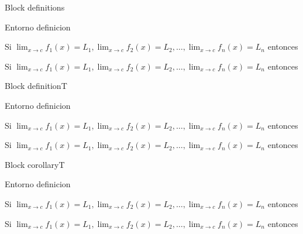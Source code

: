 \documentclass[]{beamer}
\theoremstyle{plain}
\begin{document}
\begin{frame}[fragile]{Block definitions}
\begin{source}{Entorno definicion}{}
\begin{definitions}
 Si \hspace{5pt}$\displaystyle \lim_{x\rightarrow c}f_1(x)=L_1, \displaystyle \lim_{x\rightarrow c}f_2(x)=L_2,\dots, \displaystyle \lim_{x\rightarrow c}f_n(x)=L_n $
 entonces
\end{definitions}
\end{source}
\begin{definitions}
 Si \hspace{5pt}$\displaystyle \lim_{x\rightarrow c}f_1(x)=L_1, \displaystyle \lim_{x\rightarrow c}f_2(x)=L_2,\dots, \displaystyle \lim_{x\rightarrow c}f_n(x)=L_n $
 entonces
\end{definitions}
\end{frame}
\begin{frame}[fragile]{Block definitionT}
\begin{source}{Entorno definicion}{}
\begin{definitionT}
 Si \hspace{5pt}$\displaystyle \lim_{x\rightarrow c}f_1(x)=L_1, \displaystyle \lim_{x\rightarrow c}f_2(x)=L_2,\dots, \displaystyle \lim_{x\rightarrow c}f_n(x)=L_n $
 entonces
\end{definitionT}
\end{source}
\begin{definitionT}
 Si \hspace{5pt}$\displaystyle \lim_{x\rightarrow c}f_1(x)=L_1, \displaystyle \lim_{x\rightarrow c}f_2(x)=L_2,\dots, \displaystyle \lim_{x\rightarrow c}f_n(x)=L_n $
 entonces
\end{definitionT}
\end{frame}
\begin{frame}[fragile]{Block corollaryT}
\begin{source}{Entorno definicion}{}
\begin{corollaryT}
 Si \hspace{5pt}$\displaystyle \lim_{x\rightarrow c}f_1(x)=L_1, \displaystyle \lim_{x\rightarrow c}f_2(x)=L_2,\dots, \displaystyle \lim_{x\rightarrow c}f_n(x)=L_n $
 entonces
\end{corollaryT}
\end{source}
\begin{corollaryT}
 Si \hspace{5pt}$\displaystyle \lim_{x\rightarrow c}f_1(x)=L_1, \displaystyle \lim_{x\rightarrow c}f_2(x)=L_2,\dots, \displaystyle \lim_{x\rightarrow c}f_n(x)=L_n $
 entonces
\end{corollaryT}
\end{frame}
\end{document}
